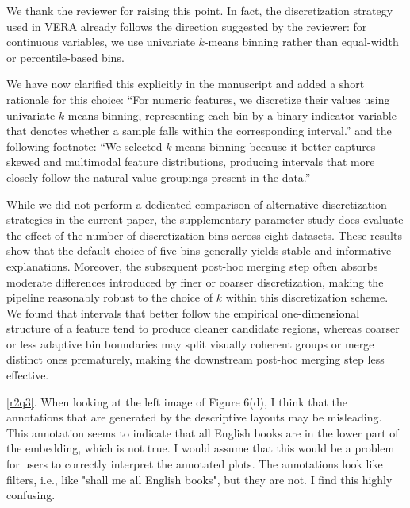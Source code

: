 \documentclass[11pt]{article}
\newcounter{rtaskno}
\newcommand{\rtask}[1]{\refstepcounter{rtaskno}\label{#1}}
\newcommand{\reviewc}[2]{\begin{leftbar}\noindent\rtask{#1}\ref{#1}. #2\end{leftbar}\vspace*{-4mm}}
\newcommand{\answer}[1]{\noindent #1\par\vspace{2mm}}
\newlength{\leftbarwidth}
\newlength{\leftbarsep}
\renewenvironment{leftbar}{%
    \def\FrameCommand{{\color{black}{\vrule width \leftbarwidth\relax\hspace {\leftbarsep}}}}%
    \MakeFramed {\advance \hsize -\width \FrameRestore }%
}{\endMakeFramed}
\begin{document}
\answer{%
We thank the reviewer for raising this point. In fact, the discretization strategy used in VERA already follows the direction suggested by the reviewer: for continuous variables, we use univariate $k$-means binning rather than equal-width or percentile-based bins.

We have now clarified this explicitly in the manuscript and added a short rationale for this choice: ``For numeric features, we discretize their values using univariate $k$-means binning, representing each bin by a binary indicator variable that denotes whether a sample falls within the corresponding interval.'' and the following footnote: ``We selected $k$-means binning because it better captures skewed and multimodal feature distributions, producing intervals that more closely follow the natural value groupings present in the data.''

While we did not perform a dedicated comparison of alternative discretization strategies in the current paper, the supplementary parameter study does evaluate the effect of the number of discretization bins across eight datasets. These results show that the default choice of five bins generally yields stable and informative explanations. Moreover, the subsequent post-hoc merging step often absorbs moderate differences introduced by finer or coarser discretization, making the pipeline reasonably robust to the choice of $k$ within this discretization scheme. We found that intervals that better follow the empirical one-dimensional structure of a feature tend to produce cleaner candidate regions, whereas coarser or less adaptive bin boundaries may split visually coherent groups or merge distinct ones prematurely, making the downstream post-hoc merging step less effective.
}


\reviewc{r2q3}{When looking at the left image of Figure 6(d), I think that the annotations that are generated by the descriptive layouts may be misleading. This annotation seems to indicate that all English books are in the lower part of the embedding, which is not true. I would assume that this would be a problem for users to correctly interpret the annotated plots. The annotations look like filters, i.e., like "shall me all English books", but they are not. I find this highly confusing.}
\end{document}
